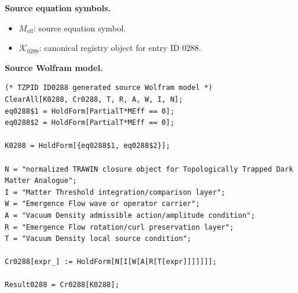 \begin{minipage}[t]{0.49\linewidth}
\begingroup
\small
\raggedright
\textbf{Source equation symbols.}\par
\begin{itemize}[leftmargin=1.35em,itemsep=1pt,topsep=1pt,parsep=0pt]
    \item $M_{\mathrm{eff}}$: source equation symbol.
    \item $\mathcal{K}_{0288}$: canonical registry object for entry ID 0288.
\end{itemize}
\endgroup
\end{minipage}\hfill
\begin{minipage}[t]{0.47\linewidth}
\begingroup
\scriptsize
\raggedright
\textbf{Source Wolfram model.}\par
\begin{Verbatim}[fontsize=\tiny,breaklines=true,breakanywhere=true]
(* TZPID ID0288 generated source Wolfram model *)
ClearAll[K0288, Cr0288, T, R, A, W, I, N];
eq0288$1 = HoldForm[PartialT*MEff == 0];
eq0288$2 = HoldForm[PartialT*MEff == 0];

K0288 = HoldForm[{eq0288$1, eq0288$2}];

N = "normalized TRAWIN closure object for Topologically Trapped Dark Matter Analogue";
I = "Matter Threshold integration/comparison layer";
W = "Emergence Flow wave or operator carrier";
A = "Vacuum Density admissible action/amplitude condition";
R = "Emergence Flow rotation/curl preservation layer";
T = "Vacuum Density local source condition";

Cr0288[expr_] := HoldForm[N[I[W[A[R[T[expr]]]]]]];

Result0288 = Cr0288[K0288];
\end{Verbatim}
\endgroup
\end{minipage}

